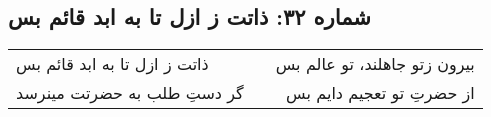 \begin{center}
\section*{شماره ۳۲: ذاتت ز ازل تا به ابد قائم بس}
\label{sec:032}
\begin{longtable}{l p{0.5cm} r}
ذاتت ز ازل تا به ابد قائم بس
&&
بیرون زتو جاهلند، تو عالم بس
\\
گر دستِ طلب به حضرتت مینرسد
&&
از حضرتِ تو تعجیم دایم بس
\\
\end{longtable}
\end{center}
